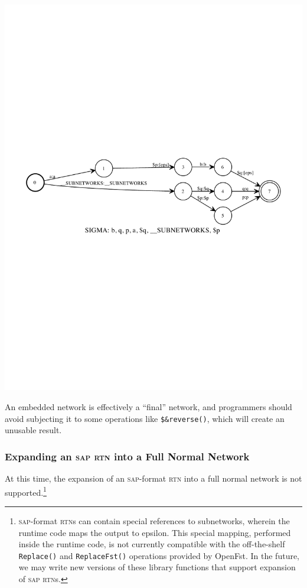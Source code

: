 \documentclass[letterpaper,12pt]{article}
\newcommand{\acro}{\textsc}
\begin{document}
\begin{center}
\includegraphics[width=\textwidth]{images/sapEpsEmbedded.pdf}
\end{center}

An embedded network is effectively a ``final'' network, and
programmers should avoid subjecting it to some operations like
\verb!$&reverse()!, which will create an unusable result.

\subsubsection{Expanding an \acro{sap} \acro{rtn} into a Full Normal Network}

At this time, the expansion of an \acro{sap}-format \acro{rtn} into a full normal network
is not supported.\footnote{\acro{sap}-format \acro{rtn}s can contain special references
to subnetworks, wherein the runtime code maps the output to epsilon.  This special
mapping, performed inside the runtime code, is not currently compatible with the
off-the-shelf \verb!Replace()! and \verb!ReplaceFst()! operations provided by OpenFst.
In the future, we may write new versions of these library functions that support
expansion of \acro{sap} \acro{rtn}s.}
\end{document}
